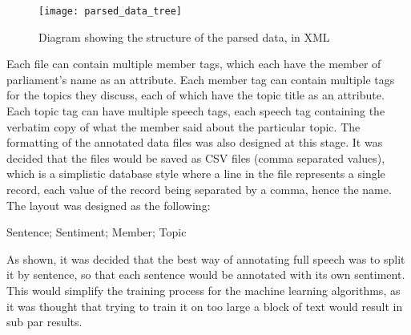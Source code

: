 \begin{figure}[h]
	\texttt{[image: parsed\_data\_tree]}
	\caption{Diagram showing the structure of the parsed data, in XML}
\end{figure}

Each file can contain multiple member tags, which each have the member of parliament’s name as an attribute. Each member tag can contain multiple tags for the topics they discuss, each of which have the topic title as an attribute. Each topic tag can have multiple speech tags, each speech tag containing the verbatim copy of what the member said about the particular topic.
The formatting of the annotated data files was also designed at this stage. It was decided that the files would be saved as CSV files (comma separated values), which is a simplistic database style where a line in the file represents a single record, each value of the record being separated by a comma, hence the name. The layout was designed as the following:

Sentence; Sentiment; Member; Topic

As shown, it was decided that the best way of annotating full speech was to split it by sentence, so that each sentence would be annotated with its own sentiment. This would simplify the training process for the machine learning algorithms, as it was thought that trying to train it on too large a block of text would result in sub par results.

